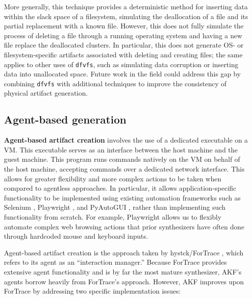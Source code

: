 More generally, this technique provides a deterministic method for
inserting data within the slack space of a filesystem, simulating the
deallocation of a file and its partial replacement with a known file.
However, this does not fully simulate the process of deleting a file
through a running operating system and having a new file replace the
deallocated clusters. In particular, this does not generate OS- or
filesystem-specific artifacts associated with deleting and creating
files; the same applies to other uses of
\passthrough{\lstinline!dfvfs!}, such as simulating data corruption or
inserting data into unallocated space. Future work in the field could
address this gap by combining \passthrough{\lstinline!dfvfs!} with
additional techniques to improve the consistency of physical artifact
generation.

\subsection{Agent-based generation}\label{agent-based-generation}

\textbf{Agent-based artifact creation} involves the use of a dedicated
executable on a VM. This executable serves as an interface between the
host machine and the guest machine. This program runs commands natively
on the VM on behalf of the host machine, accepting commands over a
dedicated network interface. This allows for greater flexibility and
more complex actions to be taken when compared to agentless approaches.
In particular, it allows application-specific functionality to be
implemented using existing automation frameworks such as Selenium
\citep{SeleniumHQSelenium2025}, Playwright
\citep{MicrosoftPlaywrightpython2025}, and PyAutoGUI
\citep{sweigartAsweigartPyautogui2025}, rather than implementing such
functionality from scratch. For example, Playwright allows us to
flexibly automate complex web browsing actions that prior synthesizers
have often done through hardcoded mouse and keyboard inputs.

Agent-based artifact creation is the approach taken by hystck/ForTrace
\citep{gobelNovelApproachGenerating2020,gobelForTraceHolisticForensic2022},
which refers to its agent as an ``interaction manager.'' Because
ForTrace provides extensive agent functionality and is by far the most
mature synthesizer, AKF's agents borrow heavily from ForTrace's
approach. However, AKF improves upon ForTrace by addressing two specific
implementation issues:

